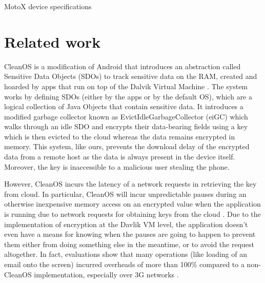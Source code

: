 \documentclass[conference,10pt]{IEEEtran}
\begin{document}
\begin{table}[]
\centering
\caption{MotoX device specifications}
\label{table:specs}
\end{table}




\section{Related work}
CleanOS is a modification of Android that introduces an abstraction called Sensitive Data Objects 
(SDOs) to track sensitive data on the RAM, created and hoarded by apps that run on top of the Dalvik 
Virtual Machine \cite{cleanos}. The system works by defining SDOs (either by the apps or by the default OS), 
which are a logical collection of Java Objects that contain sensitive data. It introduces a modified 
garbage collector known as EvictIdleGarbageCollector (eiGC) which walks through an idle SDO and 
encrypts their data-bearing fields using a key which is then evicted to the cloud whereas the data 
remains encrypted in memory.  This system, like ours, prevents the download delay of the encrypted 
data from a remote host as the data is always present in the device itself. Moreover, the key is 
inaccessible to a malicious user stealing the phone.

However, CleanOS incurs the latency of a network requests in retrieving the key from cloud.  In 
particular, CleanOS will incur unpredictable pauses during an otherwise inexpensive memory access on 
an encrypted value when the application is running due to network requests for obtaining keys from 
the cloud . Due to the implementation of encryption at the Davlik VM level, the application doesn't 
even have a means for knowing when the pauses are going to happen to prevent them either from doing 
something else in the meantime, or to avoid the request altogether.  In fact, evaluations show that 
many operations (like loading of an email onto the screen) incurred overheads of more than 100\% 
compared to a non-CleanOS implementation, especially over 3G networks \cite{cleanos}.
\end{document}
